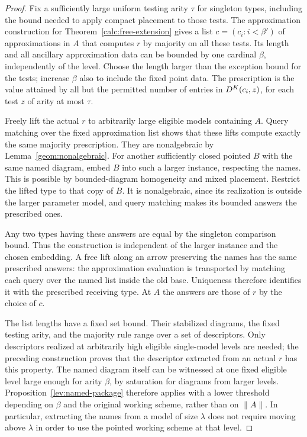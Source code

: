 \begin{proof}
Fix a sufficiently large uniform testing arity $\tau$ for singleton
types, including the bound needed to apply compact placement to those
tests.  The approximation construction for
Theorem~\ref{calc:free-extension} gives a list $c=(c_i:i<\beta')$ of
approximations in $A$ that computes $r$ by majority on all these
tests.  Its length and all ancillary approximation data can be bounded
by one cardinal $\beta$, independently of the level.  Choose the
length larger than the exception bound for the tests; increase
$\beta$ also to include the fixed point data.  The prescription is
the value attained by all but the permitted number of entries in
$D^K(c_i,z)$, for each test $z$ of arity at most $\tau$.

Freely lift the actual $r$ to arbitrarily large eligible models
containing $A$.  Query matching over the fixed approximation list
shows that these lifts compute exactly the same majority
prescription.  They are nonalgebraic by
Lemma~\ref{geom:nonalgebraic}.  For another sufficiently closed
pointed $B$ with the same named diagram, embed $B$ into such a larger
instance, respecting the names.  This is possible by bounded-diagram
homogeneity and mixed placement.  Restrict the lifted type to that
copy of $B$.  It is nonalgebraic, since its realization is outside the
larger parameter model, and query matching makes its bounded answers
the prescribed ones.

Any two types having these answers are equal by the singleton
comparison bound.  Thus the construction is independent of the
larger instance and the chosen embedding.  A free lift along an arrow
preserving the names has the same prescribed answers: the
approximation evaluation is transported by matching each query over
the named list inside the old base.  Uniqueness therefore identifies
it with the prescribed receiving type.  At $A$ the answers are those
of $r$ by the choice of $c$.

The list lengths have a fixed set bound.  Their stabilized diagrams,
the fixed testing arity, and the majority rule range over a set of
descriptors.  Only descriptors realized at arbitrarily high eligible
single-model levels are needed; the preceding construction proves
that the descriptor extracted from an actual $r$ has this property.
The named diagram itself can be witnessed at one fixed eligible
level large enough for arity $\beta$, by saturation for diagrams from
larger levels.  Proposition~\ref{lev:named-package} therefore applies
with a lower threshold depending on $\beta$ and the original working
scheme, rather than on $\|A\|$.  In particular, extracting the names
from a model of size $\lambda$ does not require moving above
$\lambda$ in order to use the pointed working scheme at that level.
\end{proof}

